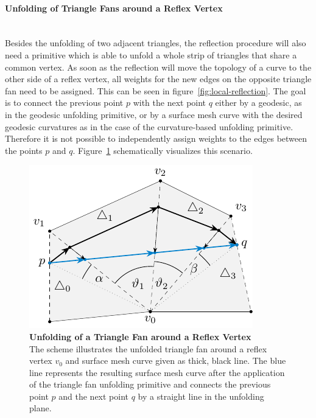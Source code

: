 \documentclass{stdlocal}
\begin{document}
  \paragraph{Unfolding of Triangle Fans around a Reflex Vertex}\hfill\\
  Besides the unfolding of two adjacent triangles, the reflection procedure will also need a primitive which is able to unfold a whole strip of triangles that share a common vertex.
  As soon as the reflection will move the topology of a curve to the other side of a reflex vertex, all weights for the new edges on the opposite triangle fan need to be assigned.
  This can be seen in figure~\ref{fig:local-reflection}.
  The goal is to connect the previous point $p$ with the next point $q$ either by a geodesic, as in the geodesic unfolding primitive, or by a surface mesh curve with the desired geodesic curvatures as in the case of the curvature-based unfolding primitive.
  Therefore it is not possible to independently assign weights to the edges between the points $p$ and $q$.
  Figure~\ref{fig:unfolding-critical-vertex} schematically visualizes this scenario.

  \begin{figure}
    \centering
    \includegraphics[width=0.55\linewidth]{figures/unfolding-critical-vertex.pdf}
    \caption[Unfolding of a Triangle Fan around a Reflex Vertex]{%
      \textbf{Unfolding of a Triangle Fan around a Reflex Vertex}\\
      The scheme illustrates the unfolded triangle fan around a reflex vertex $v_0$ and surface mesh curve given as thick, black line.
      The blue line represents the resulting surface mesh curve after the application of the triangle fan unfolding primitive and connects the previous point $p$ and the next point $q$ by a straight line in the unfolding plane.
    }
    \label{fig:unfolding-critical-vertex}
  \end{figure}
\end{document}
